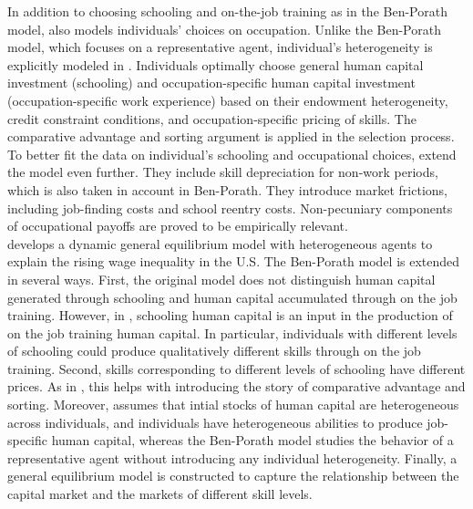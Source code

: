 \indent In addition to choosing schooling and on-the-job training as in the Ben-Porath model, \citet{keane1997career} also models individuals' choices on occupation. Unlike the Ben-Porath model, which focuses on a representative agent, individual's heterogeneity is explicitly modeled in \citet{keane1997career}. Individuals optimally choose general human capital investment (schooling) and occupation-specific human capital investment (occupation-specific work experience) based on their endowment heterogeneity, credit constraint conditions, and occupation-specific pricing of skills. The comparative advantage and sorting argument is applied in the selection process. \\
\indent To better fit the data on individual's schooling and occupational choices, \citet{keane1997career} extend the model even further. They include skill depreciation for non-work periods, which is also taken in account in Ben-Porath. They introduce market frictions, including job-finding costs and school reentry costs. Non-pecuniary components of occupational payoffs are proved to be empirically relevant.\\ %
\indent \citet{heckman1998explaining} develops a dynamic general equilibrium model with heterogeneous agents to explain the rising wage inequality in the U.S. The Ben-Porath model is extended in several ways. First, the original model does not distinguish human capital generated through schooling and human capital accumulated through on the job training. However, in \citet{heckman1998explaining}, schooling human capital is an input in the production of on the job training human capital. In particular, individuals with different levels of schooling could produce qualitatively different skills through on the job training. Second, skills corresponding to different levels of schooling have different prices. As in \citet{keane1997career}, this helps with introducing the story of comparative advantage and sorting. Moreover, \citet{heckman1998explaining} assumes that intial stocks of human capital are heterogeneous across individuals, and individuals have heterogeneous abilities to produce job-specific human capital, whereas the Ben-Porath model studies the behavior of a representative agent without introducing any individual heterogeneity. Finally, a general equilibrium model is constructed to capture the relationship between the capital market and the markets of different skill levels. \\
